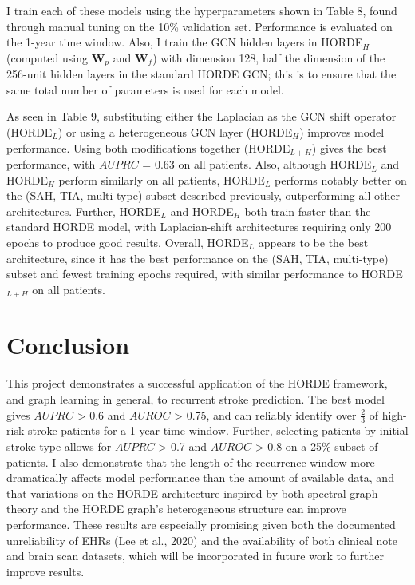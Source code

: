 \documentclass{article}
\begin{document}
I train each of these models using the hyperparameters shown in Table 8, found through manual tuning on the 10\% validation set. Performance is evaluated on the 1-year time window. Also, I train the GCN hidden layers in HORDE$_H$ (computed using \textbf{W}$_p$ and \textbf{W}$_f$) with dimension 128, half the dimension of the 256-unit hidden layers in the standard HORDE GCN; this is to ensure that the same total number of parameters is used for each model.

As seen in Table 9, substituting either the Laplacian as the GCN shift operator (HORDE$_L$) or using a heterogeneous GCN layer (HORDE$_H$) improves model performance. Using both modifications together (HORDE$_{L+H}$) gives the best performance, with $AUPRC$ = 0.63 on all patients. Also, although HORDE$_L$ and HORDE$_H$ perform similarly on all patients, HORDE$_L$ performs notably better on the (SAH, TIA, multi-type) subset described previously, outperforming all other architectures. Further, HORDE$_L$ and HORDE$_H$ both train faster than the standard HORDE model, with Laplacian-shift architectures requiring only 200 epochs to produce good results. Overall, HORDE$_L$ appears to be the best architecture, since it has the best performance on the (SAH, TIA, multi-type) subset and fewest training epochs required, with similar performance to HORDE$_{L+H}$ on all patients. 

\section{Conclusion}

This project demonstrates a successful application of the HORDE framework, and graph learning in general, to recurrent stroke prediction. The best model gives $AUPRC$ > 0.6 and $AUROC$ > 0.75, and can reliably identify over $\frac{2}{3}$ of high-risk stroke patients for a 1-year time window. Further, selecting patients by initial stroke type allows for $AUPRC$ > 0.7 and $AUROC$ > 0.8 on a 25$\%$ subset of patients. I also demonstrate that the length of the recurrence window more dramatically affects model performance than the amount of available data, and that variations on the HORDE architecture inspired by both spectral graph theory and the HORDE graph's heterogeneous structure can improve performance. These results are especially promising given both the documented unreliability of EHRs (Lee et al., 2020) and the availability of both clinical note and brain scan datasets, which will be incorporated in future work to further improve results.
\end{document}
